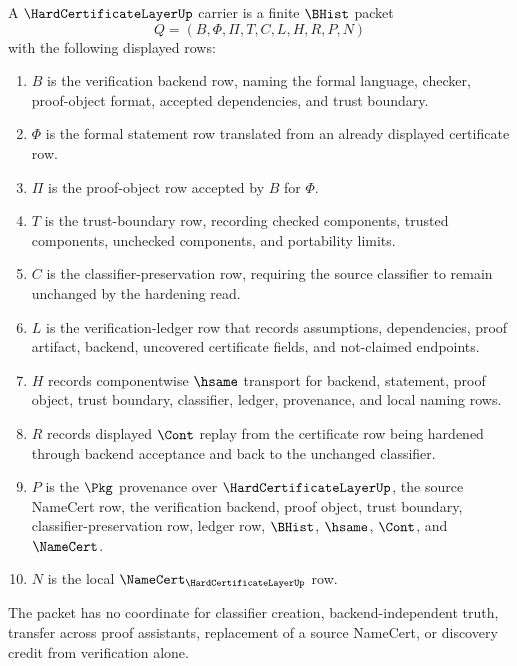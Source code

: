 \begin{definition}
\label{def:hard-certificate-layer-carrier}
A $\HardCertificateLayerUp$ carrier is a finite $\BHist$ packet
$$
Q=(B,\Phi,\Pi,T,C,L,H,R,P,N)
$$
with the following displayed rows:
\begin{enumerate}
\item $B$ is the verification backend row, naming the formal language, checker, proof-object format, accepted dependencies, and trust boundary.
\item $\Phi$ is the formal statement row translated from an already displayed certificate row.
\item $\Pi$ is the proof-object row accepted by $B$ for $\Phi$.
\item $T$ is the trust-boundary row, recording checked components, trusted components, unchecked components, and portability limits.
\item $C$ is the classifier-preservation row, requiring the source classifier to remain unchanged by the hardening read.
\item $L$ is the verification-ledger row that records assumptions, dependencies, proof artifact, backend, uncovered certificate fields, and not-claimed endpoints.
\item $H$ records componentwise $\hsame$ transport for backend, statement, proof object, trust boundary, classifier, ledger, provenance, and local naming rows.
\item $R$ records displayed $\Cont$ replay from the certificate row being hardened through backend acceptance and back to the unchanged classifier.
\item $P$ is the $\Pkg$ provenance over $\HardCertificateLayerUp$, the source NameCert row, the verification backend, proof object, trust boundary, classifier-preservation row, ledger row, $\BHist$, $\hsame$, $\Cont$, and $\NameCert$.
\item $N$ is the local $\NameCert_{\HardCertificateLayerUp}$ row.
\end{enumerate}
The packet has no coordinate for classifier creation, backend-independent truth, transfer across proof assistants, replacement of a source NameCert, or discovery credit from verification alone.
\end{definition}

